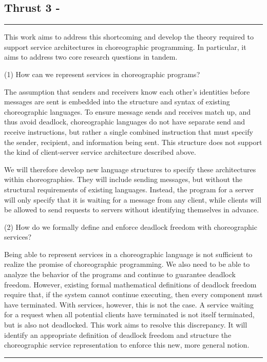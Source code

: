 \subsection{Thrust 3 - }
\label{sec:t3}

\vspace*{0.5em}
\hrule
\vspace*{0.5em}


This work aims to address this shortcoming and develop the theory required to support service architectures in choreographic programming.
In particular, it aims to address two core research questions in tandem.

(1) How can we represent services in choreographic programs?

The assumption that senders and receivers know each other's identities before messages are sent
is embedded into the structure and syntax of existing choreographic languages.
To ensure message sends and receives match up, and thus avoid deadlock,
choreographic languages do not have separate send and receive instructions,
but rather a single combined instruction that must specify the sender, recipient, and information being sent.
This structure does not support the kind of client-server service architecture described above.

We will therefore develop new language structures to specify these architectures within choreographies.
They will include sending messages, but without the structural requirements of existing languages.
Instead, the program for a server will only specify that it is waiting for a message from any client,
while clients will be allowed to send requests to servers without identifying themselves in advance.

(2) How do we formally define and enforce deadlock freedom with choreographic services?

Being able to represent services in a choreographic language is not sufficient to realize the promise of choreographic programming.
We also need to be able to analyze the behavior of the programs and continue to guarantee deadlock freedom.
However, existing formal mathematical definitions of deadlock freedom require that,
if the system cannot continue executing, then every component must have terminated.
With services, however, this is not the case.
A service waiting for a request when all potential clients have terminated is not itself terminated, but is also not deadlocked.
This work aims to resolve this discrepancy.
It will identify an appropriate definition of deadlock freedom and structure
the choreographic service representation to enforce this new, more general notion.

\vspace*{0.5em}
\hrule
\vspace*{0.5em}



